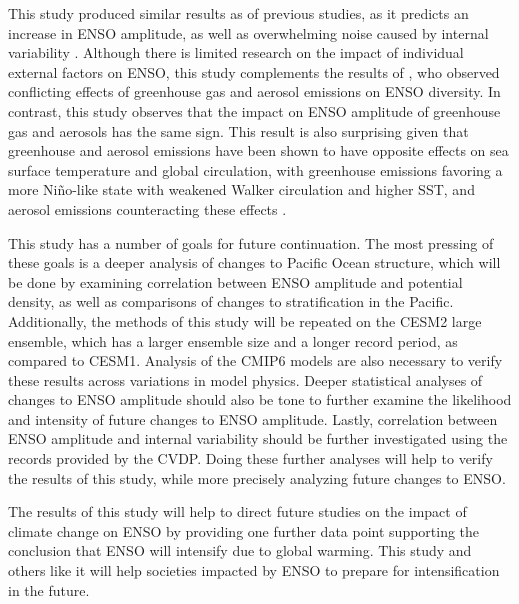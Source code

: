 \documentclass[draft]{agujournal2019}
\begin{document}
This study produced similar results as of previous studies, as it predicts an increase in ENSO amplitude, as well as overwhelming noise caused by internal variability \cite{maher2018enso}. Although there is limited research on the impact of individual external factors on ENSO, this study complements the results of , who observed conflicting effects of greenhouse gas and aerosol emissions on ENSO diversity. In contrast, this study observes that the impact on ENSO amplitude of greenhouse gas and aerosols has the same sign. This result is also surprising given that greenhouse and aerosol emissions have been shown to have opposite effects on sea surface temperature and global circulation, with greenhouse emissions favoring a more Ni\~{n}o-like state with weakened Walker circulation and higher SST, and aerosol emissions counteracting these effects \cite{boer2000transient}.

This study has a number of goals for future continuation. The most pressing of these goals is a deeper analysis of changes to Pacific Ocean structure, which will be done by examining correlation between ENSO amplitude and potential density, as well as comparisons of changes to stratification in the Pacific. Additionally, the methods of this study will be repeated on the CESM2 large ensemble, which has a larger ensemble size and a longer record period, as compared to CESM1. Analysis of the CMIP6 models are also necessary to verify these results across variations in model physics. Deeper statistical analyses of changes to ENSO amplitude should also be tone to further examine the likelihood and intensity of future changes to ENSO amplitude. Lastly, correlation between ENSO amplitude and internal variability should be further investigated using the records provided by the CVDP. Doing these further analyses will help to verify the results of this study, while more precisely analyzing future changes to ENSO.

The results of this study will help to direct future studies on the impact of climate change on ENSO by providing one further data point supporting the conclusion that ENSO will intensify due to global warming. This study and others like it will help societies impacted by ENSO to prepare for intensification in the future.


\end{document}
